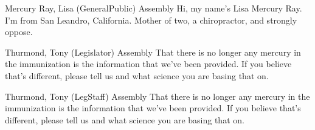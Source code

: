 \begin{result}{7.018925291222924}{Mercury Ray, Lisa (GeneralPublic) Assembly}
Hi, my name's Lisa Mercury Ray. I'm from San Leandro, California. Mother of two, a chiropractor, and strongly oppose.
\end{result}

\begin{result}{6.689088671002102}{Thurmond, Tony (Legislator) Assembly}
That there is no longer any mercury in the immunization is the information that we've been provided. If you believe that's different, please tell us and what science you are basing that on.
\end{result}

\begin{result}{6.689088671002102}{Thurmond, Tony (LegStaff) Assembly}
That there is no longer any mercury in the immunization is the information that we've been provided. If you believe that's different, please tell us and what science you are basing that on.
\end{result}

